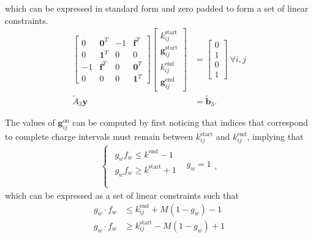 which can be expressed in standard form and zero padded to form a set of linear constraints.
\begin{equation} \label{eqn:idxStart2}\begin{aligned}
	\begin{bmatrix} 0 & \mathbf{0}^T & -1 & \mathbf{f}^T \\
		        0 & \mathbf{1}^T &  0 & 0            \\
		       -1 & \mathbf{f}^T & 0 & \mathbf{0}^T  \\
		        0 & 0            & 0 & \mathbf{1}^T 
	\end{bmatrix} 
	\begin{bmatrix} k_{ij}^{\text{start}}       \\
		        \mathbf{g}_{ij}^{\text{start}} \\ 
			k_{ij}^{\text{end}}        \\ 
			\mathbf{g}_{ij}^{\text{end}} 
	\end{bmatrix} &= 
	\begin{bmatrix} 0 \\ 
			1 \\
	                0 \\
			1
	\end{bmatrix} \ \forall i,j \\
	\tilde{A}_3\mathbf{y} &= \tilde{\mathbf{b}}_3.
\end{aligned} \end{equation}

 The values of $\mathbf{g}_{ij}^{\text{on}}$ can be computed by first noticing that indices that correspond to complete charge intervals must remain between $k_{ij}^{\text{start}}$ and $k_{ij}^{\text{end}}$, implying that 
\begin{equation}\label{eqn:gOnCases}\begin{aligned}
	\begin{cases}
		\begin{array}{ll}
			g_w f_w \le k^{\text{end}} - 1  \\
			g_w f_w \ge k^{\text{start}} + 1\\ 
		\end{array} & g_w = 1 \\
	\end{cases},
\end{aligned} \end{equation}
which can be expressed as a set of linear constraints such that
\begin{equation} \label{eqn:gOnBigM}\begin{aligned}
	g_w\cdot f_w &\le k^{\text{end}}_{ij} + M(1 - g_w) - 1 \\
	g_w\cdot f_w &\ge k^{\text{start}}_{ij} - M(1 - g_w) + 1 \\ 
\end{aligned} \end{equation}
